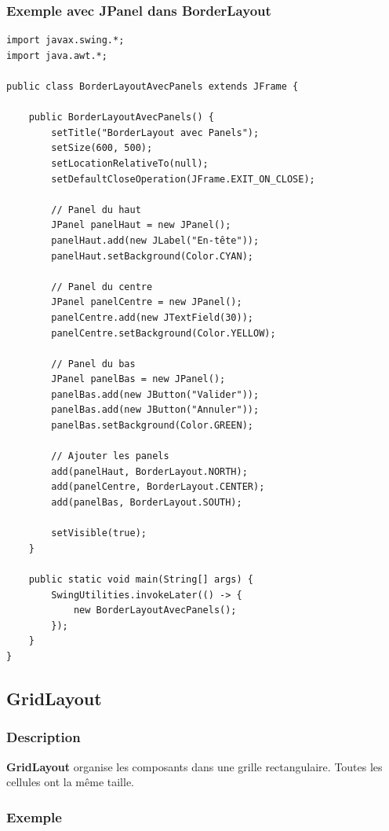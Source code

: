 \documentclass[11pt,a4paper]{article}
\begin{document}
\subsubsection{Exemple avec JPanel dans BorderLayout}

\begin{lstlisting}
import javax.swing.*;
import java.awt.*;

public class BorderLayoutAvecPanels extends JFrame {
    
    public BorderLayoutAvecPanels() {
        setTitle("BorderLayout avec Panels");
        setSize(600, 500);
        setLocationRelativeTo(null);
        setDefaultCloseOperation(JFrame.EXIT_ON_CLOSE);
        
        // Panel du haut
        JPanel panelHaut = new JPanel();
        panelHaut.add(new JLabel("En-tête"));
        panelHaut.setBackground(Color.CYAN);
        
        // Panel du centre
        JPanel panelCentre = new JPanel();
        panelCentre.add(new JTextField(30));
        panelCentre.setBackground(Color.YELLOW);
        
        // Panel du bas
        JPanel panelBas = new JPanel();
        panelBas.add(new JButton("Valider"));
        panelBas.add(new JButton("Annuler"));
        panelBas.setBackground(Color.GREEN);
        
        // Ajouter les panels
        add(panelHaut, BorderLayout.NORTH);
        add(panelCentre, BorderLayout.CENTER);
        add(panelBas, BorderLayout.SOUTH);
        
        setVisible(true);
    }
    
    public static void main(String[] args) {
        SwingUtilities.invokeLater(() -> {
            new BorderLayoutAvecPanels();
        });
    }
}
\end{lstlisting}

\subsection{GridLayout}

\subsubsection{Description}

\textbf{GridLayout} organise les composants dans une grille rectangulaire. Toutes les cellules ont la même taille.

\subsubsection{Exemple}
\end{document}
